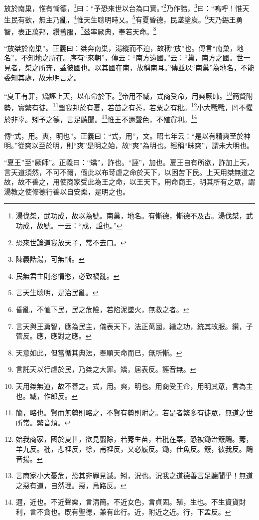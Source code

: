 放於南巢，惟有慚德，\footnote{湯伐桀，武功成，故以為號。南巢，地名。有慚德，慚德不及古。湯伐桀，武功成，故號。一云：“成，諡也。”}曰：“予恐來世以台為口實。”\footnote{恐來世論道我放天子，常不去口。}乃作誥，\footnote{陳義誥湯，可無慚。}曰：“嗚呼！惟天生民有欲，無主乃亂，\footnote{民無君主則恣情慾，必致禍亂。}惟天生聰明時乂。\footnote{言天生聰明，是治民亂。}有夏昏德，民墜塗炭。\footnote{昏亂，不恤下民，民之危險，若陷泥墜火，無救之者。}天乃錫王勇智，表正萬邦，纘舊服，\footnote{言天與王勇智，應為民主，儀表天下，法正萬國，繼之功，統其故服。纘，子管反。應，應對之應。}茲率厥典，奉若天命。\footnote{天意如此，但當循其典法，奉順天命而已，無所慚。}

{\noindent\shu{}\fzkt “放桀於南巢”。正義曰：桀奔南巢，湯縱而不迫，故稱“放”也。傳言“南巢，地名”，不知地之所在。序有“來朝”，傳云：“南方遠國。”云：“巢，南方之國。世一見者，桀之所奔，蓋彼國也。以其國在南，故稱南耳。”傳並以“南巢”為地名，不能委知其處，故未明言之。 \par}

“夏王有罪，矯誣上天，以布命於下。\footnote{言託天以行虐於民，乃桀之大罪。矯，居表反。誣音無。}帝用不臧，式商受命，用爽厥師。\footnote{天用桀無道，故不善之。式，用。爽，明也。用商受王命，用明其眾，言為主也。臧，作郎反。}簡賢附勢，實繁有徒。\footnote{簡，略也。賢而無勢則略之，不賢有勢則附之。若是者繁多有徒眾，無道之世所常。繁音煩。}肇我邦於有夏，若苗之有莠，若粟之有秕。\footnote{始我商家，國於夏世，欲見翦除，若莠生苗，若秕在粟，恐被鋤治簸颺。莠，羊九反。秕，悲裡反，徐，甫裡反，又必履反。鋤，仕魚反。簸，彼我反。颺音揚。}小大戰戰，罔不懼於非辜。矧予之德，言足聽聞。\footnote{言商家小大憂危，恐其非罪見滅。矧，況也。況我之道德善言足聽聞乎！無道之惡有道，自然理。惡，烏路反。}惟王不邇聲色，不殖貨利。\footnote{邇，近也。不近聲樂，言清簡。不近女色，言貞固。殖，生也。不生資貨財利，言不貪也。既有聖德，兼有此行。近，附近之近。行，下孟反。}


{\noindent\zhuan{}\fzbyks 傳“式，用。爽，明也”。正義曰：“式，用”，文。昭七年云：“是以有精爽至於神明。”從爽以至於明，則“爽”是明之始，故“爽”為明也。經稱“昧爽”，謂未大明也。 \par}

{\noindent\shu{}\fzkt “夏王”至“厥師”。正義曰：“矯”，詐也。“誣”，加也。夏王自有所欲，詐加上天，言天道須然，不可不爾，假此以布苛虐之命於天下，以困苦下民。上天用桀無道之故，故不善之，用使商家受此為王之命，以王天下。用命商王，明其所有之眾，謂湯教之使修德行善以自安樂，是明之也。 \par}

